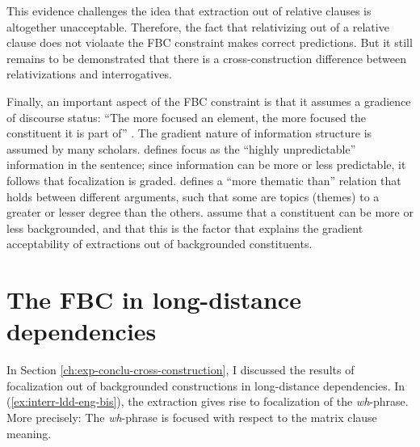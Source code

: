 {This evidence challenges the idea that extraction out of relative clauses is altogether unacceptable. Therefore, the fact that relativizing out of a relative clause does not violaate the FBC constraint makes correct predictions. But it still remains to be demonstrated that there is a cross-construction difference between relativizations and interrogatives.}

Finally, \label{ch:general-analysis-gradability}
an important aspect of the FBC constraint is that it assumes a gradience of discourse status:
``The more focused an element, the more focused the constituent
it is part of''  \citep[21]{Abeille.2020.Cognition}. The gradient nature of information structure is assumed by many scholars. \citet{Kuno.1987} defines focus as the ``highly unpredictable'' information in the sentence; since information can be more or less predictable, it follows that focalization is graded. \citet[310--311]{Webelhuth.2007} defines a ``more thematic than'' relation that holds between different arguments, such that some are topics (themes) to a greater or lesser degree than the others. 
\citet[369]{Ambridge.2008} assume that a constituent can be more or less backgrounded, and that this is the factor that explains the gradient acceptability of extractions out of backgrounded constituents.

\section{The FBC in long-distance dependencies}
\label{ch:analysis-ldd}

In Section \ref{ch:exp-conclu-cross-construction}, I discussed the results of focalization out of backgrounded constructions in long-distance dependencies. In (\ref{ex:interr-ldd-eng-bis}), the extraction gives rise to focalization of the \emph{wh}-phrase. More precisely: The \emph{wh}-phrase is focused with respect to the matrix clause meaning.

\ea \label{ex:interr-ldd-eng-bis}
\z 

